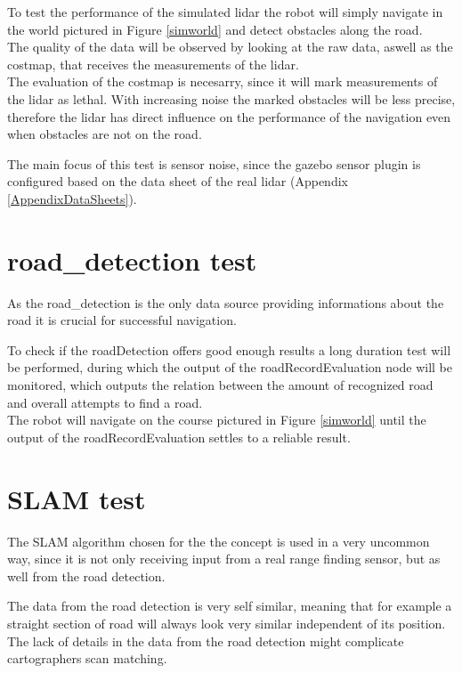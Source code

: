 To test the performance of the simulated lidar the robot will simply navigate in the world pictured in Figure \ref{simworld} and detect obstacles along the road.\\

The quality of the data will be observed by looking at the raw data, aswell as the costmap, that receives the measurements of the lidar.\\

The evaluation of the costmap is necesarry, since it will mark measurements of the lidar as lethal. With increasing noise the marked obstacles will be less precise, therefore the lidar has direct influence on the performance of the navigation even when obstacles are not on the road.

The main focus of this test is sensor noise, since the gazebo sensor plugin is configured based on the data sheet of the real lidar (Appendix \ref{AppendixDataSheets}).

\section{road\_detection test}
As the road\_detection is the only data source providing informations about the road it is crucial for successful navigation.

To check if the roadDetection offers good enough results a long duration test will be performed, during which the output of the roadRecordEvaluation node will be monitored, which outputs the relation between the amount of recognized road and overall attempts to find a road.\\

The robot will navigate on the course pictured in Figure \ref{simworld} until the output of the roadRecordEvaluation settles to a reliable result.

\section{SLAM test}
The SLAM algorithm chosen for the the concept is used in a very uncommon way, since it is not only receiving input from a real range finding sensor, but as well from the road detection.

The data from the road detection is very self similar, meaning that for example a straight section of road will always look very similar independent of its position. The lack of details in the data from the road detection might complicate cartographers scan matching.

